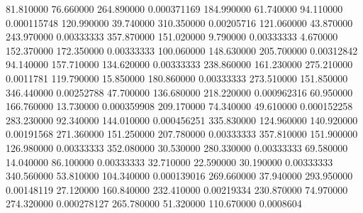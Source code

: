 81.810000	76.660000	264.890000	0.000371169
184.990000	61.740000	94.110000	0.000115748
120.990000	39.740000	310.350000	0.00205716
121.060000	43.870000	243.970000	0.00333333
357.870000	151.020000	9.790000	0.00333333
4.670000	152.370000	172.350000	0.00333333
100.060000	148.630000	205.700000	0.00312842
94.140000	157.710000	134.620000	0.00333333
238.860000	161.230000	275.210000	0.0011781
119.790000	15.850000	180.860000	0.00333333
273.510000	151.850000	346.440000	0.00252788
47.700000	136.680000	218.220000	0.000962316
60.950000	166.760000	13.730000	0.000359908
209.170000	74.340000	49.610000	0.000152258
283.230000	92.340000	144.010000	0.000456251
335.830000	124.960000	140.920000	0.00191568
271.360000	151.250000	207.780000	0.00333333
357.810000	151.900000	126.980000	0.00333333
352.080000	30.530000	280.330000	0.00333333
69.580000	14.040000	86.100000	0.00333333
32.710000	22.590000	30.190000	0.00333333
340.560000	53.810000	104.340000	0.000139016
269.660000	37.940000	293.950000	0.00148119
27.120000	160.840000	232.410000	0.00219334
230.870000	74.970000	274.320000	0.000278127
265.780000	51.320000	110.670000	0.0008604
